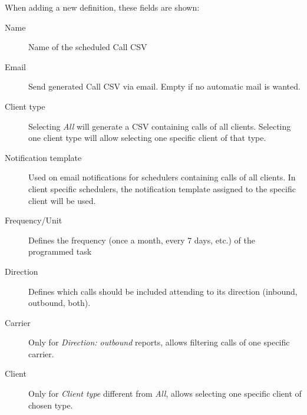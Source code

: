 \documentclass[letterpaper,10pt,spanish]{sphinxmanual}
\begin{document}
When adding a new definition, these fields are shown:
\begin{description}
\item[{Name}] \leavevmode{}\label{administration_portal/brand/calls/call_csv_schedulers:term-name}
Name of the scheduled Call CSV

\item[{Email}] \leavevmode{}\label{administration_portal/brand/calls/call_csv_schedulers:term-email}
Send generated Call CSV via email. Empty if no automatic mail is wanted.

\item[{Client type}] \leavevmode{}\label{administration_portal/brand/calls/call_csv_schedulers:term-client-type}
Selecting \emph{All} will generate a CSV containing calls of all clients. Selecting one client type
will allow selecting one specific client of that type.

\item[{Notification template}] \leavevmode{}\label{administration_portal/brand/calls/call_csv_schedulers:term-notification-template}
Used on email notifications for schedulers containing calls of all clients. In client specific
schedulers, the notification template assigned to the specific client will be used.

\item[{Frequency/Unit}] \leavevmode{}\label{administration_portal/brand/calls/call_csv_schedulers:term-frequency-unit}
Defines the frequency (once a month, every 7 days, etc.) of the programmed task

\item[{Direction}] \leavevmode{}\label{administration_portal/brand/calls/call_csv_schedulers:term-direction}
Defines which calls should be included attending to its direction (inbound, outbound, both).

\item[{Carrier}] \leavevmode{}\label{administration_portal/brand/calls/call_csv_schedulers:term-carrier}
Only for \emph{Direction: outbound} reports, allows filtering calls of one specific carrier.

\item[{Client}] \leavevmode{}\label{administration_portal/brand/calls/call_csv_schedulers:term-client}
Only for \emph{Client type} different from \emph{All}, allows selecting one specific client of chosen type.


\end{description}
\end{document}

